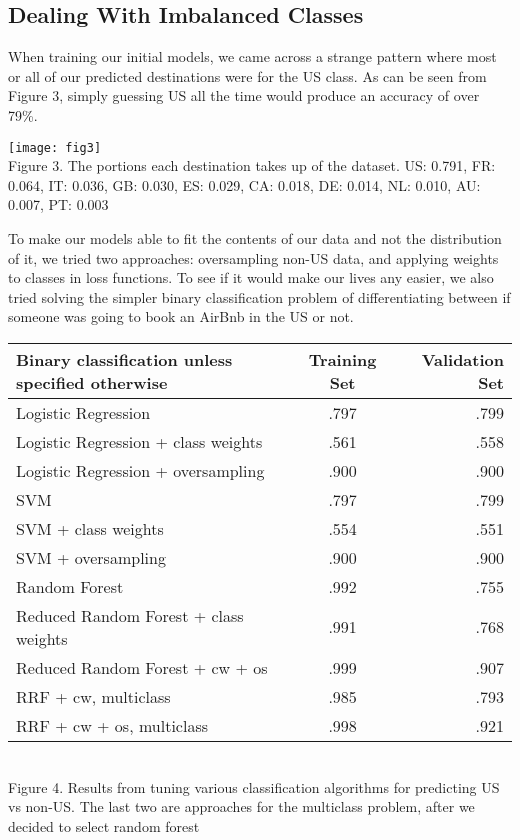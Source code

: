 \documentclass[a4paper, 11pt]{article}
\begin{document}
\subsection*{Dealing With Imbalanced Classes}
\par
When training our initial models, we came across a strange pattern where most or all of our predicted destinations were for the US class. As can be seen from Figure 3, simply guessing US all the time would produce an accuracy of over 79\%. 

\begin{center}
\texttt{[image: fig3]} \\
Figure 3. The portions each destination takes up of the dataset. US: 0.791, FR: 0.064, IT: 0.036, GB: 0.030, ES: 0.029, CA: 0.018, DE: 0.014, NL: 0.010, AU: 0.007, PT: 0.003
\end{center}

To make our models able to fit the contents of our data and not the distribution of it, we tried two approaches: oversampling non-US data, and applying weights to classes in loss functions. To see if it would make our lives any easier, we also tried solving the simpler binary classification problem of differentiating between if someone was going to book an AirBnb in the US or not.

\begin{center}
\begin{tabular}{ l | c | r}
  Binary classification unless specified otherwise & Training Set & Validation Set \\
  \hline
  Logistic Regression & .797 & .799 \\
  Logistic Regression + class weights & .561 & .558 \\
  Logistic Regression + oversampling & .900 & .900 \\
  SVM & .797 & .799 \\
  SVM + class weights & .554 & .551 \\
  SVM + oversampling & .900 & .900 \\
  Random Forest & .992 & .755 \\
  Reduced Random Forest + class weights & .991 & .768 \\
  Reduced Random Forest + cw + os & .999 & .907 \\
  RRF + cw, multiclass & .985 & .793 \\
  RRF + cw + os, multiclass & .998 & .921 \\
\end{tabular} \\
Figure 4. Results from tuning various classification algorithms for predicting US vs non-US. The last two are approaches for the multiclass problem, after we decided to select random forest
\end{center}
\end{document}

